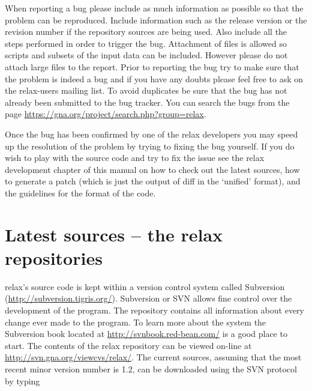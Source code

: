 When reporting a bug please include as much information as possible so that the problem can be reproduced.  Include information such as the release version or the revision number if the repository sources are being used.  Also include all the steps performed in order to trigger the bug.  Attachment of files is allowed so scripts and subsets of the input data can be included.  However please do not attach large files to the report.  Prior to reporting the bug try to make sure that the problem is indeed a bug and if you have any doubts please feel free to ask on the relax-users mailing list.  To avoid duplicates be sure that the bug has not already been submitted to the bug tracker.  You can search the bugs from the page \href{https://gna.org/project/search.php?group=relax}{https://gna.org/project/search.php?group=relax}.

Once the bug has been confirmed by one of the relax developers you may speed up the resolution of the problem by trying to fixing the bug yourself.  If you do wish to play with the source code and try to fix the issue see the relax development chapter of this manual on how to check out the latest sources, how to generate a patch (which is just the output of diff in the `unified' format), and the guidelines for the format of the code.




\section{Latest sources -- the relax repositories}

relax's source code is kept within a version control system called Subversion (\href{http://subversion.tigris.org/}{http://subversion.tigris.org/}).  Subversion or SVN allows fine control over the development of the program.  The repository contains all information about every change ever made to the program.  To learn more about the system the Subversion book located at \href{http://svnbook.red-bean.com/}{http://svnbook.red-bean.com/} is a good place to start.  The contents of the relax repository can be viewed on-line at \href{http://svn.gna.org/viewcvs/relax/}{http://svn.gna.org/viewcvs/relax/}.  The current sources, assuming that the most recent minor version number is 1.2, can be downloaded using the SVN protocol by typing

